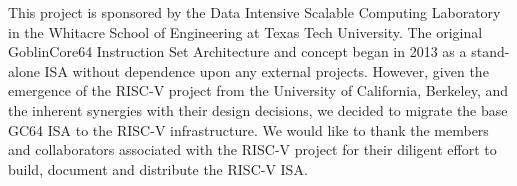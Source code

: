 \documentclass{article}
\begin{document}
This project is sponsored by the Data Intensive Scalable Computing Laboratory in the Whitacre School of Engineering at Texas Tech University.  The original GoblinCore64 Instruction Set Architecture and concept began in 2013 as a stand-alone ISA without dependence upon any external projects.  However, given the emergence of the RISC-V project from the University of California, Berkeley, and the inherent synergies with their design decisions, we decided to migrate the base GC64 ISA to the RISC-V infrastructure.  We would like to thank the members and collaborators associated with the RISC-V project for their diligent effort to build, document and distribute the RISC-V ISA.  



\end{document}
